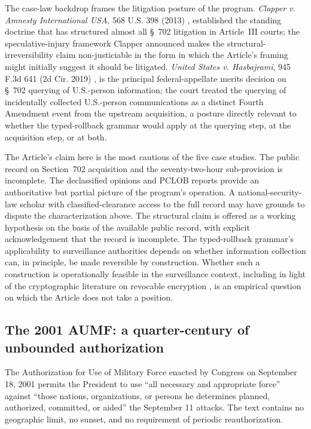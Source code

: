 The case-law backdrop frames the litigation posture of the program.
\emph{Clapper v. Amnesty International USA}, 568 U.S. 398 (2013) \cite{ref_clapper_v_amnesty_2013},
established the standing doctrine that has structured almost all \S~702 litigation in Article~III
courts; the speculative-injury framework Clapper announced makes the structural-irreversibility claim
non-justiciable in the form in which the Article's framing might initially suggest it should be
litigated.
\emph{United States v. Hasbajrami}, 945 F.3d 641 (2d Cir. 2019) \cite{ref_us_v_hasbajrami_2019}, is
the principal federal-appellate merits decision on \S~702 querying of U.S.-person information; the
court treated the querying of incidentally collected U.S.-person communications as a distinct Fourth
Amendment event from the upstream acquisition, a posture directly relevant to whether the typed-rollback
grammar would apply at the querying step, at the acquisition step, or at both.

The Article's claim here is the most cautious of the five case studies.
The public record on Section~702 acquisition and the seventy-two-hour sub-provision is incomplete.
The declassified opinions and PCLOB reports provide an authoritative but partial picture of the
program's operation.
A national-security-law scholar with classified-clearance access to the full record may have grounds to
dispute the characterization above.
The structural claim is offered as a working hypothesis on the basis of the available public record,
with explicit acknowledgement that the record is incomplete.
The typed-rollback grammar's applicability to surveillance authorities depends on whether information
collection can, in principle, be made reversible by construction.
Whether such a construction is operationally feasible in the surveillance context, including in light
of the cryptographic literature on revocable encryption \cite{ref_revocable_encryption_lit}, is an
empirical question on which the Article does not take a position.

\subsection{The 2001 AUMF: a quarter-century of unbounded authorization}
\label{sec:cases:aumf}

The Authorization for Use of Military Force enacted by Congress on September 18, 2001 \cite{ref_aumf_2001}
permits the President to use ``all necessary and appropriate force'' against ``those nations, organizations, or persons
he determines planned, authorized, committed, or aided'' the September 11 attacks.
The text contains no geographic limit, no sunset, and no requirement of periodic reauthorization.

